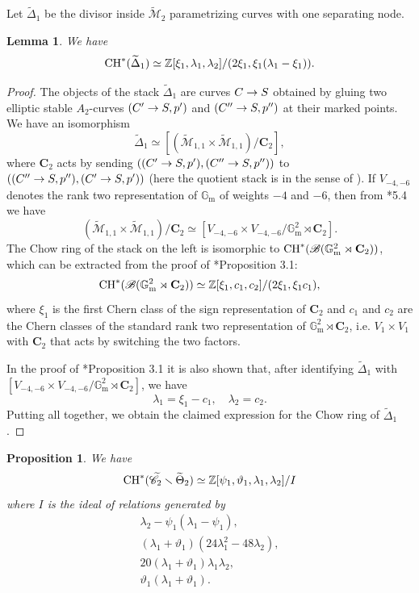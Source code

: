 \documentclass[a4paper, 10pt]{amsart}
\numberwithin{equation}{section}
\numberwithin{subsection}{section}
\newtheorem{proposition}[theorem]{Proposition}
\newtheorem{lemma}[theorem]{Lemma}
\theoremstyle{definition}
\theoremstyle{remark}
\renewcommand{\mathcal}{\mathscr}
\newcommand\GG{\mathbb{G}} \newcommand\HH{\mathbb{H}}
\newcommand\bC{\mathbf{C}} \newcommand\bD{\mathbf{D}}
\newcommand\rmm{\mathrm{m}} \newcommand\rmn{\mathrm{n}}
\newcommand\arr{\ifinner\to\else\longrightarrow\fi}
\newcommand{\gm}{\GG_{\rmm}}
\newcommand{\Mtilde}{\widetilde{\mathcal M}}
\newcommand{\Ctilde}{\widetilde{\mathcal C}}
\newcommand{\Dtilde}{\widetilde{\Delta}}
\newcommand{\ThTilde}{\widetilde{\Theta}}
\newcommand{\ch}[1][*]{\operatorname{CH}^{#1}}
\begin{document}
	Let $\Dtilde_1$ be the divisor inside $\Mtilde_2$ parametrizing curves with one separating node.
	\begin{lemma}\label{lem:delta1}
	We have
		\[ \ch(\Dtilde_1)\simeq \ZZ[\xi_1,\lambda_1,\lambda_2]/(2\xi_1,\xi_1(\lambda_1-\xi_1)). \]
	\end{lemma}
	\begin{proof}
		 The objects of the stack $\Dtilde_1$ are curves $C\arr S$ obtained by gluing two elliptic stable $A_2$-curves $(C'\arr S,p')$ and $(C''\arr S,p'')$ at their marked points. We have an isomorphism
		\[ \Dtilde_1 \simeq [(\Mtilde_{1,1}\times \Mtilde_{1,1})/\bC_2], \]
		where $\bC_2$ acts by sending $((C'\arr S,p'),(C''\arr S,p''))$ to $((C''\arr S,p''),(C'\arr S,p'))$ (here the quotient stack is in the sense of \cite{Rom}).
		If $V_{-4,-6}$ denotes the rank two representation of $\gm$ of weights $-4$ and $-6$, then from \cite{EG}*{5.4} we have
		\[ \left(\Mtilde_{1,1}\times \Mtilde_{1,1}\right)/\bC_2 \simeq [V_{-4,-6}\times V_{-4,-6}/\gm^2\rtimes\bC_2]. \]
		The Chow ring of the stack on the left is isomorphic to $\ch(\cB(\gm^2\rtimes\bC_2))$, which can be extracted from the proof of \cite{DLV}*{Proposition 3.1}:
		\[ \ch(\cB(\gm^2\rtimes\bC_2)) \simeq \ZZ[\xi_1,c_1,c_2]/(2\xi_1,\xi_1c_1), \]
		where $\xi_1$ is the first Chern class of the sign representation of $\bC_2$ and $c_1$ and $c_2$ are the Chern classes of the standard rank two representation of $\gm^2\rtimes\bC_2$, i.e. $V_1\times V_1$ with $\bC_2$ that acts by switching the two factors.
		
		In the proof of \cite{DLV}*{Proposition 3.1} it is also shown that, after identifying $\Dtilde_1$ with $[V_{-4,-6}\times V_{-4,-6}/\gm^2\rtimes\bC_2]$, we have
		\[ \lambda_1=\xi_1-c_1, \quad\lambda_2=c_2. \]
		Putting all together, we obtain the claimed expression for the Chow ring of $\Dtilde_1$.
	\end{proof}	   
	\begin{proposition}\label{prop:chow C minus ThTilde2}
		We have
		\[ \ch(\Ctilde_2\smallsetminus\ThTilde_2)\simeq \ZZ[\psi_1,\vartheta_1,\lambda_1,\lambda_2]/I\]
		where $I$ is the ideal of relations generated by
		\begin{align*}
			\lambda_2-\psi_1(\lambda_1-\psi_1),\\
			(\lambda_1+\vartheta_1)(24\lambda_1^2-48\lambda_2),\\
			20(\lambda_1+\vartheta_1)\lambda_1\lambda_2,\\
			\vartheta_1(\lambda_1+\vartheta_1). 
		\end{align*}
	\end{proposition}
	
\end{document}
